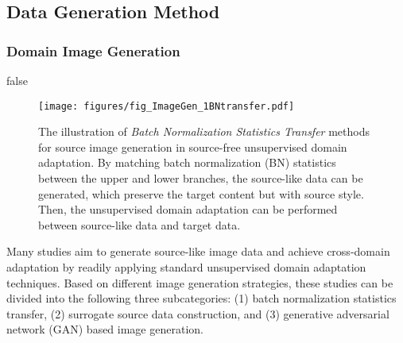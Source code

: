 \documentclass[10pt,journal,compsoc]{IEEEtran}
\begin{document}
\subsection{Data Generation Method}\label{sec_data_generation}
\subsubsection{Domain Image Generation}\label{sec_domain_image_generation}
\if false
\begin{figure}[!t]
\setlength{\abovecaptionskip}{0pt}
\setlength{\belowcaptionskip}{-2pt}
\setlength{\abovedisplayskip}{-2pt}
\setlength{\belowdisplayskip}{-2pt}
	\centering
	\texttt{[image: figures/fig\_ImageGen\_1BNtransfer.pdf]}
	\caption{
	The illustration of \emph{Batch Normalization Statistics Transfer} methods for source image generation in source-free unsupervised domain adaptation.
	By matching batch normalization (BN) statistics between the upper and lower branches, the source-like data can be generated, which preserve the target content but with source style.
	Then, the unsupervised domain adaptation can be performed between source-like data and target data.
	}
	\label{fig_ImageGen_1BNtransfer}
\end{figure}
\fi

Many studies aim to generate source-like image data and achieve cross-domain adaptation by readily applying standard unsupervised domain adaptation techniques.
Based on different image generation strategies, these studies can be divided into the following three subcategories: (1) batch normalization statistics transfer, (2) surrogate source data construction, and (3) generative adversarial network (GAN) based image generation.
\end{document}
